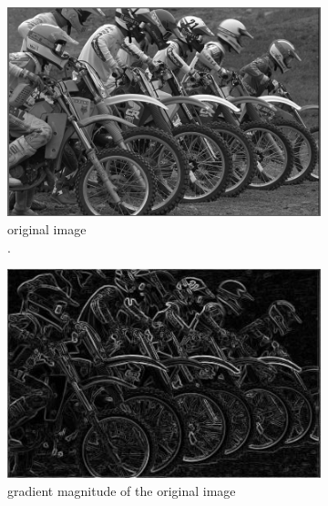 \begin{figure}
     \centering
     \begin{subfigure}[b]{0.3\textwidth}
         \centering
         \includegraphics[width=\textwidth]{./figs/reference_gry}
         \caption{original image\\.}
         \label{fig:gmsd_ref_gry}
     \end{subfigure}
     \hfill
     \begin{subfigure}[b]{0.3\textwidth}
         \centering
         \includegraphics[width=\textwidth]{./figs/reference_mag}
         \caption{gradient magnitude of the original image}
         \label{fig:gmsd_ref_mag}
     \end{subfigure}
     \hfill
     \begin{subfigure}[b]{0.3\textwidth}
         \centering

\end{subfigure}
\end{figure}
